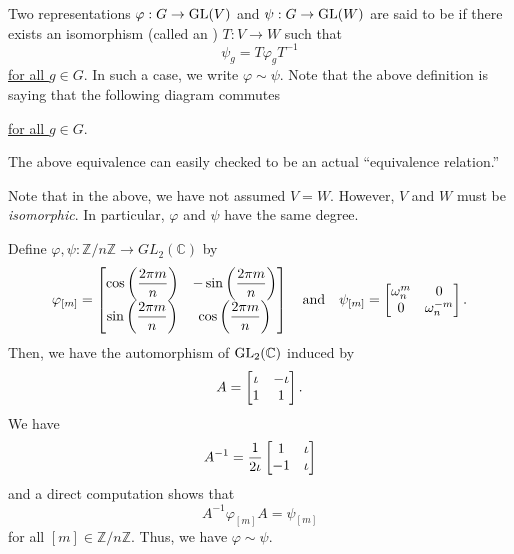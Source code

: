 \begin{defn}%
	Two representations $\varphi : G \to \operatorname{GL}(V)$ and $\psi : G \to \operatorname{GL}(W)$ are said to be  if there exists an isomorphism (called an ) $T : V \to W$ such that 
	\begin{equation*} 
		\psi_g = T\varphi_g T^{-1}
	\end{equation*}
	\underline{for all $g \in G.$} In such a case, we write $\varphi\sim\psi.$ Note that the above definition is saying that the following diagram commutes
	\begin{center}
	\end{center}
	\underline{for all $g \in G.$}
\end{defn}
The above equivalence can easily checked to be an actual ``equivalence relation.''
\begin{rem}
	Note that in the above, we have not assumed $V = W.$ However, $V$ and $W$ must be \emph{isomorphic}. In particular, $\varphi$ and $\psi$ have the same degree.
\end{rem}

\begin{ex} \label{ex:ZnZGL2Cequiv}
	Define $\varphi, \psi:\mathbb{Z}/n\mathbb{Z} \to GL_2(\mathbb{C})$ by
	\begin{equation*} 
		\varphi_{[m]} = \begin{bmatrix}
			\cos\left(\dfrac{2\pi m}{n}\right) & -\sin\left(\dfrac{2\pi m}{n}\right)\\
			\sin\left(\dfrac{2\pi m}{n}\right) & \cos\left(\dfrac{2\pi m}{n}\right)
		\end{bmatrix} 
		\quad\text{and}\quad \psi_{[m]} = \begin{bmatrix}
			\omega_n^m & 0\\
			0 & \omega_n^{-m}
		\end{bmatrix}.
	\end{equation*}
	Then, we have the automorphism of $\operatorname{GL}_2(\mathbb{C})$ induced by 
	\begin{equation*} 
		A = \begin{bmatrix} \iota & -\iota \\ 1 & 1 \end{bmatrix}.
	\end{equation*}
	We have
	\begin{equation*} 
		A^{-1} = \dfrac{1}{2\iota}\begin{bmatrix} 1 & \iota \\ -1 & \iota \end{bmatrix}
	\end{equation*}
	and a direct computation shows that
	\begin{equation*} 
		A^{-1}\varphi_{[m]}A = \psi_{[m]}
	\end{equation*}
	for all $[m] \in \mathbb{Z}/n\mathbb{Z}.$ Thus, we have $\varphi\sim\psi.$
\end{ex}

